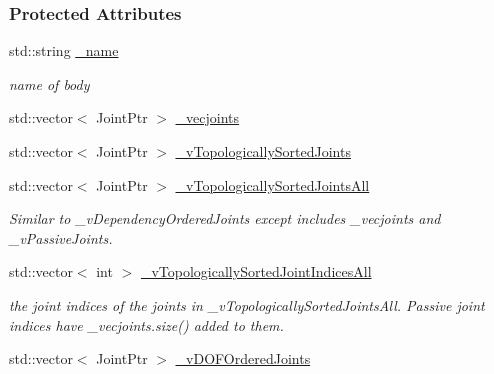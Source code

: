 \subsubsection*{Protected Attributes}
\begin{DoxyCompactItemize}
\item 
\hypertarget{classOpenRAVE_1_1KinBody_aaf2ed934b37cbbd236fdd1b01a5f5005}{
std::string \hyperlink{classOpenRAVE_1_1KinBody_aaf2ed934b37cbbd236fdd1b01a5f5005}{\_\-name}}
\label{classOpenRAVE_1_1KinBody_aaf2ed934b37cbbd236fdd1b01a5f5005}

\begin{DoxyCompactList}\small\item\em name of body \item\end{DoxyCompactList}\item 
std::vector$<$ JointPtr $>$ \hyperlink{classOpenRAVE_1_1KinBody_a8eb8f9943c05cd08afba576dba39871a}{\_\-vecjoints}
\item 
std::vector$<$ JointPtr $>$ \hyperlink{classOpenRAVE_1_1KinBody_a57a836d771622beb63fd79d96445d7c3}{\_\-vTopologicallySortedJoints}
\item 
\hypertarget{classOpenRAVE_1_1KinBody_ac4536665c649aeb43699f45c7774446f}{
std::vector$<$ JointPtr $>$ \hyperlink{classOpenRAVE_1_1KinBody_ac4536665c649aeb43699f45c7774446f}{\_\-vTopologicallySortedJointsAll}}
\label{classOpenRAVE_1_1KinBody_ac4536665c649aeb43699f45c7774446f}

\begin{DoxyCompactList}\small\item\em Similar to \_\-vDependencyOrderedJoints except includes \_\-vecjoints and \_\-vPassiveJoints. \item\end{DoxyCompactList}\item 
\hypertarget{classOpenRAVE_1_1KinBody_aa731820a61e6c11c59a75e7dfffecd90}{
std::vector$<$ int $>$ \hyperlink{classOpenRAVE_1_1KinBody_aa731820a61e6c11c59a75e7dfffecd90}{\_\-vTopologicallySortedJointIndicesAll}}
\label{classOpenRAVE_1_1KinBody_aa731820a61e6c11c59a75e7dfffecd90}

\begin{DoxyCompactList}\small\item\em the joint indices of the joints in \_\-vTopologicallySortedJointsAll. Passive joint indices have \_\-vecjoints.size() added to them. \item\end{DoxyCompactList}\item 
\hypertarget{classOpenRAVE_1_1KinBody_ae7d1b91b54b1ab04baee502a4dc26567}{
std::vector$<$ JointPtr $>$ \hyperlink{classOpenRAVE_1_1KinBody_ae7d1b91b54b1ab04baee502a4dc26567}{\_\-vDOFOrderedJoints}}
\label{classOpenRAVE_1_1KinBody_ae7d1b91b54b1ab04baee502a4dc26567}


\end{DoxyCompactItemize}
